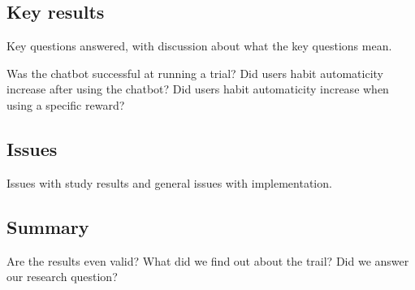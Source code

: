 \subsection{Key results}

Key questions answered, with discussion about what the key questions mean.\newline

\large{Was the chatbot successful at running a trial?}\newline
\large{Did users habit automaticity increase after using the chatbot?}\newline
\large{Did users habit automaticity increase when using a specific reward?}


\subsection{Issues}
Issues with study results and general issues with implementation.


\subsection{Summary}

Are the results even valid? What did we find out about the trail? Did we answer our research question?


